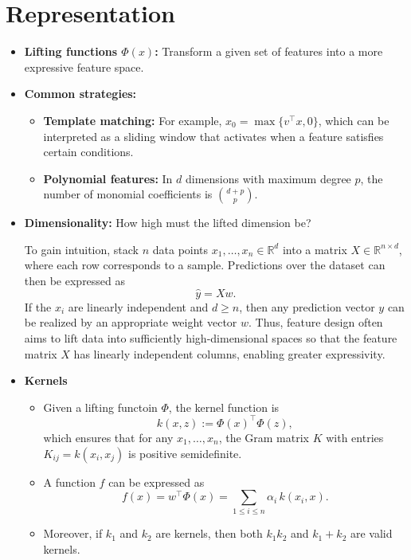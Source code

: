 \documentclass[a4paper]{article}
\begin{document}
\section{Representation}
\begin{itemize}
    \item \textbf{Lifting functions $\Phi(x)$:} Transform a given set of features into a more expressive feature space.
    \item \textbf{Common strategies:}
    \begin{itemize}
        \item \textbf{Template matching:} For example, $x_0 = \max\{v^\top x, 0\}$, which can be interpreted as a sliding window that activates when a feature satisfies certain conditions.
        \item \textbf{Polynomial features:} In $d$ dimensions with maximum degree $p$, the number of monomial coefficients is $\binom{d+p}{p}$.
    \end{itemize}
    \item \textbf{Dimensionality:} How high must the lifted dimension be?  

    To gain intuition, stack $n$ data points $x_1, \ldots, x_n \in \mathbb{R}^d$ into a matrix $X \in \mathbb{R}^{n \times d}$, where each row corresponds to a sample. Predictions over the dataset can then be expressed as
    \[
    \hat{y} = Xw.
    \]
    If the $x_i$ are linearly independent and $d \geq n$, then any prediction vector $y$ can be realized by an appropriate weight vector $w$. Thus, feature design often aims to lift data into sufficiently high-dimensional spaces so that the feature matrix $X$ has linearly independent columns, enabling greater expressivity.

    \item \textbf{Kernels}
        \begin{itemize}
            \item Given a lifting functoin $\Phi$, the kernel function is
        \[
        k(x,z) := \Phi(x)^\top \Phi(z),
        \]
        which ensures that for any $x_1,\dots,x_n$, the Gram matrix $K$ with entries $K_{ij}=k(x_i,x_j)$ is positive semidefinite.

            \item A function $f$ can be expressed as
        \[
            f(x) = w^\top \Phi(x) = \sum_{1 \leq i \leq n} \alpha_i \, k(x_i, x).
        \]
            \item Moreover, if $k_1$ and $k_2$ are kernels, then both $k_1 k_2$ and $k_1 + k_2$ are valid kernels.
        \end{itemize}
\end{itemize}
\end{document}
